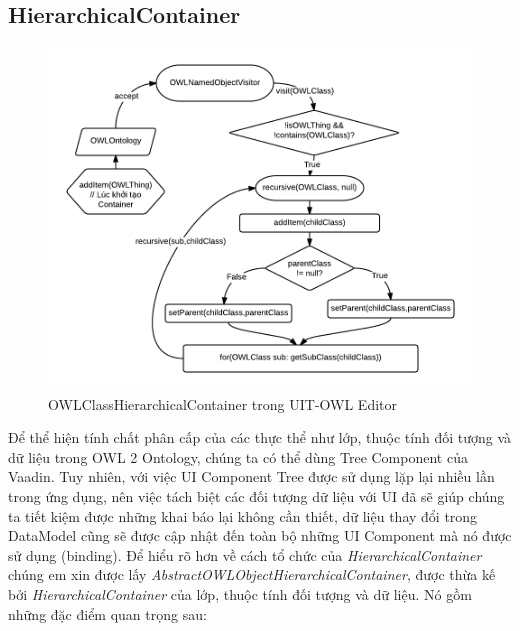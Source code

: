 \subsection{HierarchicalContainer}
\begin{figure}[ht!]
	\centering
	\includegraphics[width=145mm]{Figures/owleditor_hccontainer.png}
	\caption{OWLClassHierarchicalContainer trong UIT-OWL Editor\label{overflow}}
\end{figure}
Để thể hiện tính chất phân cấp của các thực thể như lớp, thuộc tính đối tượng và dữ liệu trong OWL 2 Ontology, chúng ta có thể dùng Tree Component của Vaadin. Tuy nhiên, với việc UI Component Tree được sử dụng lặp lại nhiều lần trong ứng dụng, nên việc tách biệt các đối tượng dữ liệu với UI đã sẽ giúp chúng ta tiết kiệm được những khai báo lại không cần thiết, dữ liệu thay đổi trong DataModel cũng sẽ được cập nhật đến toàn bộ những UI Component mà nó được sử dụng (binding). Để hiểu rõ hơn về cách tổ chức của \textit{HierarchicalContainer} chúng em xin được lấy  \textit{AbstractOWLObjectHierarchicalContainer}, được thừa kế bởi \textit{HierarchicalContainer} của lớp, thuộc tính đối tượng và dữ liệu. Nó gồm những đặc điểm quan trọng sau:
